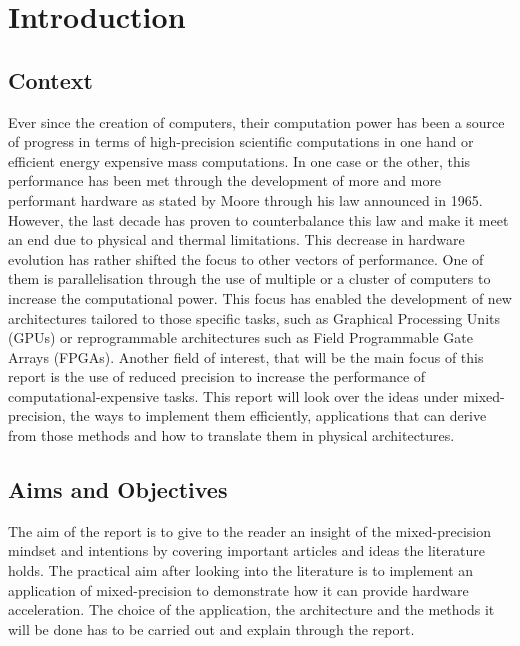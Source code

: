 \chapter{Introduction} %

\label{Chapter1} %



\section{Context}

Ever since the creation of computers, their computation power has been a source of progress in terms of high-precision scientific computations in one hand or efficient energy expensive mass computations. In one case or the other, this performance has been met through the development of more and more performant hardware as stated by Moore through his law announced in 1965. However, the last decade has proven to counterbalance this law and make it meet an end due to physical and thermal limitations. This decrease in hardware evolution has rather shifted the focus to other vectors of performance. One of them is parallelisation through the use of multiple or a cluster of computers to increase the computational power. This focus has enabled the development of new architectures tailored to those specific tasks, such as Graphical Processing Units (GPUs) or reprogrammable architectures such as Field Programmable Gate Arrays (FPGAs). Another field of interest, that will be the main focus of this report is the use of reduced precision to increase the performance of computational-expensive tasks. This report will look over the ideas under mixed-precision, the ways to implement them efficiently, applications that can derive from those methods and how to translate them in physical architectures.

\section{Aims and Objectives}

The aim of the report is to give to the reader an insight of the mixed-precision mindset and intentions by covering important articles and ideas the literature holds. The practical aim after looking into the literature is to implement an application of mixed-precision to demonstrate how it can provide hardware acceleration. The choice of the application, the architecture and the methods it will be done has to be carried out and explain through the report.

